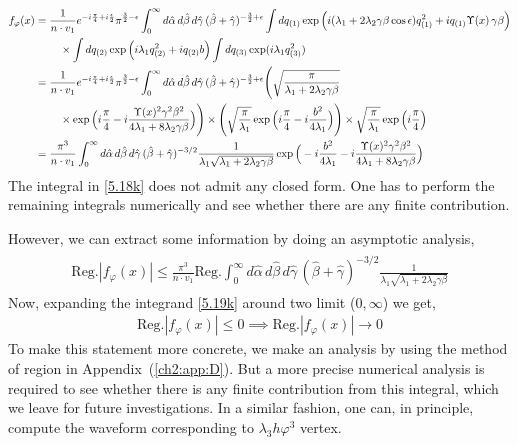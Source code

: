 \begin{align}
    \begin{split}
        f_{\varphi}(x)&=\frac{1}{n\cdot v_1}e^{-i\frac{\pi}{4}+i\frac{\epsilon}{2}}\pi^{\frac{3}{2}-\epsilon}\int_{0}^{\infty}d\hat\alpha\,d\hat\beta\,d\hat\gamma \,(\hat\beta+\hat\gamma)^{-\frac{3}{2}+\epsilon}\int dq_{(1)}\exp\Big(i(\lambda_1+2\lambda_2\gamma\beta\cos\epsilon)q_{(1)}^2+i q_{(1)}\Upsilon(x)\,\gamma\beta\Big)\\ &
        \hspace{0.8cm}\times \int dq_{(2)}\exp\Big(i\lambda_1 q_{(2)}^2+iq_{(2)}b\Big)\int dq_{(3)} \exp(i\lambda_1 q_{(3)}^2)\\ & =  \frac{1}{n\cdot v_1}e^{-i\frac{\pi}{4}+i\frac{\epsilon}{2}}\pi^{\frac{3}{2}-\epsilon}\int_{0}^{\infty}d\hat\alpha\,d\hat\beta\,d\hat\gamma \,(\hat\beta+\hat\gamma)^{-\frac{3}{2}+\epsilon}\Bigg(\sqrt{\frac{\pi}{\lambda_1 +2\lambda_2\gamma\beta}}\\ &
        \hspace{0.8cm}\times\exp\Big(i\frac{\pi}{4}-i\frac{\Upsilon(x)^2\gamma^2\beta^2}{4\lambda_1 +8\lambda_2\gamma\beta}\Big)\Bigg)\times \Bigg(\sqrt{\frac{\pi}{\lambda_1}}\exp\Big(i\frac{\pi}{4}-i\frac{b^2}{4\lambda_1}\Big)\Bigg)\times \sqrt{\frac{\pi}{\lambda_1}}\exp\Big(i\frac{\pi}{4}\Big)\\ &
        =\frac{\pi^3}{n\cdot v_1}\int_0^\infty d\hat\alpha \, d\hat\beta\,d\hat\gamma\,(\hat\beta+\hat\gamma)^{-3/2}\frac{1}{\lambda_1\sqrt{\lambda_1+2\lambda_2\gamma\beta}}\exp\Big(-i\frac{b^2}{4\lambda_1}-i\frac{\Upsilon(x)^2\gamma^2\beta^2}{4\lambda_1 +8\lambda_2\gamma\beta}\Big)\label{5.18k}
    \end{split}
\end{align}
The integral in \eqref{5.18k} does not admit any closed form. One has to perform the remaining integrals numerically and see whether there are any finite contribution.\par  However, we can extract some information by doing an asymptotic analysis,
\begin{align}
    \begin{split}
        \textrm{Reg.}|f_{\varphi}(x)|\le \frac{\pi^3}{n\cdot v_1}\textrm{Reg.}\int_0^\infty d\hat\alpha \, d\hat\beta\,d\hat\gamma\,(\hat\beta+\hat\gamma)^{-3/2}\frac{1}{\lambda_1\sqrt{\lambda_1+2\lambda_2\gamma\beta}}\label{5.19k}
    \end{split}
\end{align}
Now, expanding the integrand \eqref{5.19k} around two limit ($0,\infty$) we get,
\begin{align}
     \textrm{Reg.}|f_{\varphi}(x)|\le 0\implies  \textrm{Reg.}|f_{\varphi}(x)|\to 0
\end{align}
To make this statement more concrete, we make an analysis by using the method of region in Appendix~(\ref{ch2:app:D}). But a more precise numerical analysis is required to see whether there is any finite contribution from this integral, which we leave for future investigations.  In a similar fashion, one can, in principle, compute the waveform corresponding to $\lambda_3h\varphi^3$ vertex. 


